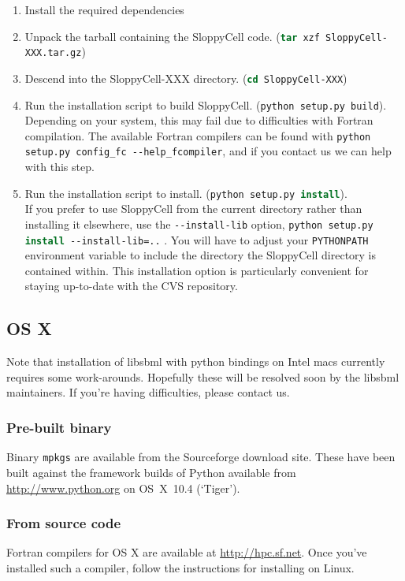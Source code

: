 \documentclass[12pt]{article}
\newcommand{\shell}[1]{\lstinline[language=csh, showstringspaces=False]!#1!}
\begin{document}
\begin{enumerate}
\item Install the required dependencies
\item Unpack the tarball containing the SloppyCell code. (\shell{tar xzf SloppyCell-XXX.tar.gz})
\item Descend into the SloppyCell-XXX directory. (\shell{cd SloppyCell-XXX})
\item Run the installation script to build SloppyCell. (\shell{python setup.py build}).\\
Depending on your system, this may fail due to difficulties with Fortran compilation. The available Fortran compilers can be found with  \shell{python setup.py config_fc --help_fcompiler}, and if you contact us we can help with this step.
\item Run the installation script to install. (\shell{python setup.py install}).\\
If you prefer to use SloppyCell from the current directory rather than installing it elsewhere, use the \shell{--install-lib} option, \shell{python setup.py install --install-lib=..} . 
You will have to adjust your \shell{PYTHONPATH} environment variable to include the directory the SloppyCell directory is contained within. 
This installation option is particularly convenient for staying up-to-date with the CVS repository.
\end{enumerate}

\subsection{OS X}
Note that installation of libsbml with python bindings on Intel macs currently requires some work-arounds. Hopefully these will be resolved soon by the libsbml maintainers. If you're having difficulties, please contact us.

\subsubsection{Pre-built binary}
Binary \shell{mpkgs} are available from the Sourceforge download site.
These have been built against the framework builds of Python available from \url{http://www.python.org} on OS~X~10.4 (`Tiger').

\subsubsection{From source code}
Fortran compilers for OS X are available at  \url{http://hpc.sf.net}. Once you've installed 
such a compiler, follow the instructions for installing on Linux.
\end{document}
